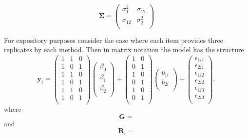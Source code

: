 \documentclass[12pt, a4paper]{report}
\theoremstyle{plain}
\theoremstyle{definition}
\theoremstyle{remark}
\begin{document}
\begin{equation}
\boldsymbol{\Sigma} = \left( \begin{array}{cc}
\sigma^2_{1} & \sigma_{12} \\
\sigma_{12} & \sigma^2_{2} \\
\end{array}\right)
\end{equation}

For expository purposes consider the case where each item provides three replicates by each method. Then in matrix notation the model has the structure
\begin{equation}
\boldsymbol{y}_{i} =
\left(
\begin{array}{ccc}
1 & 1 & 0 \\
1 & 0 & 1 \\
1 & 1 & 0 \\
1 & 0 & 1 \\
1 & 1 & 0 \\
1 & 0 & 1 \\
\end{array}
\right)
\left(
\begin{array}{c}         \beta_0 \\ \beta_1 \\ \beta_2 \\
\end{array}
\right)
+  \left(
\begin{array}{cc}
1 & 0 \\
0 & 1 \\
1 & 0 \\
0 & 1 \\
1 & 0 \\
0 & 1 \\
\end{array}
\right)\left(
\begin{array}{c}
b_{1i} \\   b_{2i} \\
\end{array}
\right)
+
\left(
\begin{array}{c}
\epsilon_{1i1} \\
\epsilon_{2i1} \\
\epsilon_{1i2} \\
\epsilon_{2i2} \\
\epsilon_{1i3} \\
\epsilon_{2i3} \\
\end{array}
\right) ,
\end{equation}
where
\[
\boldsymbol{G} =
\]
and
\[
\boldsymbol{R}_i =
\]
\end{document}
